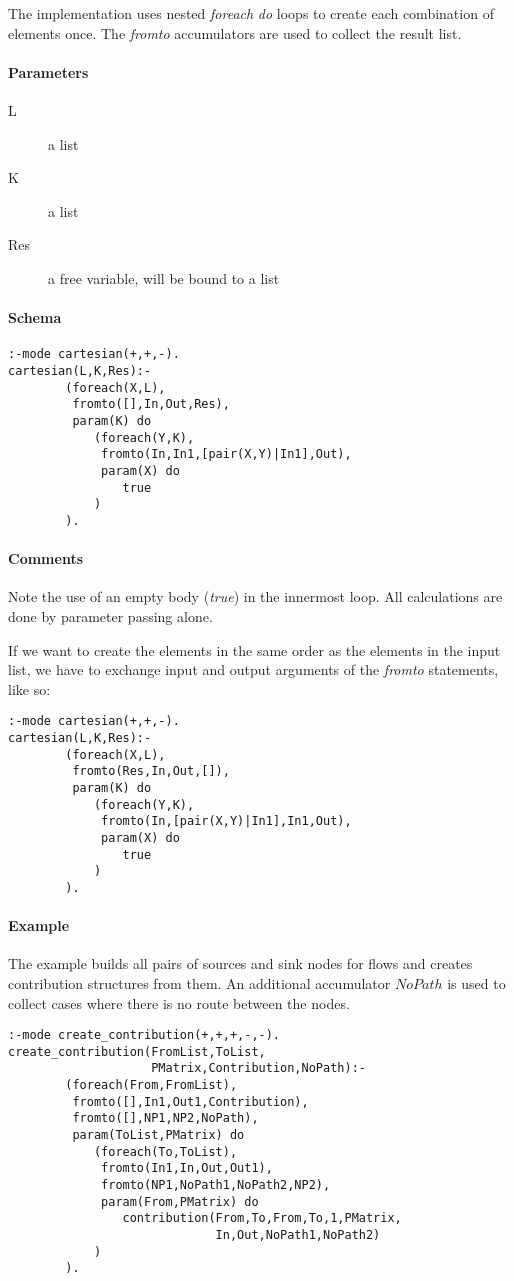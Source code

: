 \documentclass[a4paper,12pt]{report}
\begin{document}
The implementation uses nested {\it foreach} {\it do} loops to create each combination of elements once. The {\it fromto} accumulators are used to collect the result list.
\paragraph{Parameters}
\begin{description}
\item[L] a list
\item[K] a list
\item[Res] a free variable, will be bound to a list
\end{description}
\paragraph{Schema}
\begin{verbatim}
:-mode cartesian(+,+,-).
cartesian(L,K,Res):-
        (foreach(X,L),
         fromto([],In,Out,Res),
         param(K) do
            (foreach(Y,K),
             fromto(In,In1,[pair(X,Y)|In1],Out),
             param(X) do
                true
            )
        ).
\end{verbatim}
\paragraph{Comments}
Note the use of an empty body ({\it true}) in the innermost loop. All calculations are done by parameter passing alone.

If we want to create the elements in the same order as the elements in the input list, we have to exchange input and output arguments of the {\it fromto} statements, like so:
\pagebreak
\begin{verbatim}
:-mode cartesian(+,+,-).
cartesian(L,K,Res):-
        (foreach(X,L),
         fromto(Res,In,Out,[]),
         param(K) do
            (foreach(Y,K),
             fromto(In,[pair(X,Y)|In1],In1,Out),
             param(X) do
                true
            )
        ).
\end{verbatim}
\paragraph{Example}

The example builds all pairs of sources and sink nodes for flows and creates contribution structures from them. An additional accumulator $NoPath$ is used to collect cases where there is no route between the nodes.
\begin{verbatim}
:-mode create_contribution(+,+,+,-,-).
create_contribution(FromList,ToList,
                    PMatrix,Contribution,NoPath):-
        (foreach(From,FromList),
         fromto([],In1,Out1,Contribution),
         fromto([],NP1,NP2,NoPath),
         param(ToList,PMatrix) do
            (foreach(To,ToList),
             fromto(In1,In,Out,Out1),
             fromto(NP1,NoPath1,NoPath2,NP2),
             param(From,PMatrix) do
                contribution(From,To,From,To,1,PMatrix,
                             In,Out,NoPath1,NoPath2)
            )
        ).
\end{verbatim}
\end{document}
